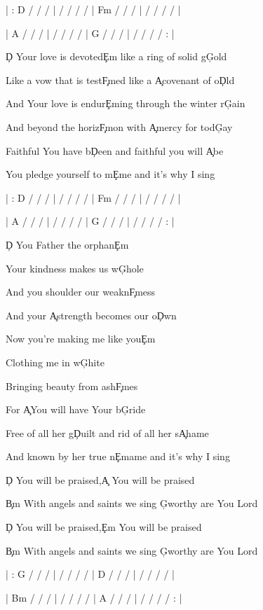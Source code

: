 \documentclass[9pt]{extarticle}
\begin{document}
\bsong

\bi
| : D / / /  |  / / / /  |  F\s m / / /  |  / / / /  |

|  A / / /  |  / / / /  |  G / / /  |  / / / / : |
\ei

\bv
\c{D} Your love is devoted\c{Em} like a ring of solid g\c{G}old

Like a vow that is test\c{F\s m}ed like a \c{A}covenant of o\c{D}ld

And Your love is endur\c{Em}ing through the winter r\c{G}ain

And beyond the horiz\c{F\s m}on with \c{A}mercy for tod\c{G}ay
\ev

\bp
Faithful You have b\c{D}een and faithful you will \c{A}be

You pledge yourself to m\c{Em}e and it's why I sing
\ep

\bc
{}



\ec

\bin
| : D / / /  |  / / / /  |  F\s m / / /  |  / / / /  |

|  A / / /  |  / / / /  |  G / / /  |  / / / / : |
\ein

\bv
\c{D} You Father the orphan\c{Em}

Your kindness makes us w\c{G}hole

And you shoulder our weakn\c{F\s m}ess

And your \c{A}strength becomes our o\c{D}wn

Now you're making me like you\c{Em}

Clothing me in w\c{G}hite

Bringing beauty from ash\c{F\s m}es

For \c{A}You will have Your b\c{G}ride
\ev

\bp
Free of all her g\c{D}uilt and rid of all her s\c{A}hame

And known by her true n\c{Em}ame and it's why I sing
\ep


\bb[2]
\c{D} You will be praised,\c{A} You will be praised

\c{Bm} With angels and saints we sing \c{G}worthy are You Lord

\c{D} You will be praised,\c{Em} You will be praised

\c{Bm} With angels and saints we sing \c{G}worthy are You Lord
\eb


\bo
| : G / / /  |  / / / /  |  D / / /  |  / / / /  |

|  Bm / / /  |  / / / /  |  A / / /  |  / / / / : |
\eo

\esong
\end{document}
